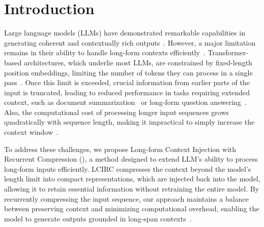 \section{Introduction}


Large language models (LLMs) have demonstrated remarkable capabilities in generating coherent and contextually rich outputs~\cite{zhao2023survey,wang2024beyond}. However, a major limitation remains in their ability to handle long-form contexts efficiently~\cite{liu2024lost,li2024long}. Transformer-based architectures, which underlie most LLMs, are constrained by fixed-length position embeddings, limiting the number of tokens they can process in a single pass~\cite{chen2021simple,lin2022survey}. Once this limit is exceeded, crucial information from earlier parts of the input is truncated, leading to reduced performance in tasks requiring extended context, such as document summarization~\cite{koh2022empirical} or long-form question answering~\cite{fan2019eli5}. Also, the computational cost of processing longer input sequences grows quadratically with sequence length, making it impractical to simply increase the context window~\cite{fournier2023practical,chen2023extending}.

To address these challenges, we propose Long-form Context Injection with Recurrent Compression (\model), a method designed to extend LLM's ability to process long-form inputs efficiently. LCIRC compresses the context beyond the model's length limit into compact representations, which are injected back into the model, allowing it to retain essential information without retraining the entire model. By recurrently compressing the input sequence, our approach maintains a balance between preserving context and minimizing computational overhead, enabling the model to generate outputs grounded in long-span contexts~\cite{valmeekam2023llmzip,chen2024melodi,lester2024training}.


